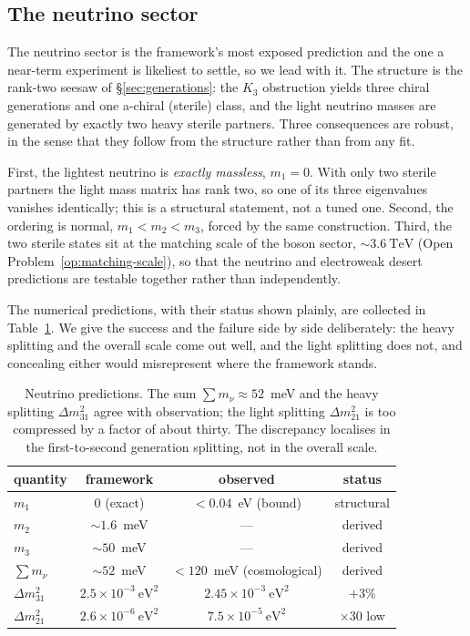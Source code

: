 \subsection{The neutrino sector}

The neutrino sector is the framework's most exposed prediction and the one a near-term experiment is
likeliest to settle, so we lead with it. The structure is the rank-two seesaw of
\S\ref{sec:generations}: the $K_3$ obstruction yields three chiral generations and one a-chiral
(sterile) class, and the light neutrino masses are generated by exactly two heavy sterile partners.
Three consequences are robust, in the sense that they follow from the structure rather than from any
fit.

First, the lightest neutrino is \emph{exactly massless}, $m_1 = 0$. With only two sterile partners
the light mass matrix has rank two, so one of its three eigenvalues vanishes identically; this is a
structural statement, not a tuned one. Second, the ordering is normal, $m_1 < m_2 < m_3$, forced by
the same construction. Third, the two sterile states sit at the matching scale of the boson sector,
$\sim 3.6\ \mathrm{TeV}$ (Open Problem~\ref{op:matching-scale}), so that the neutrino and electroweak
desert predictions are testable together rather than independently.

The numerical predictions, with their status shown plainly, are collected in
Table~\ref{tab:neutrino}. We give the success and the failure side by side deliberately: the heavy
splitting and the overall scale come out well, and the light splitting does not, and concealing
either would misrepresent where the framework stands.

\begin{table}[h]
\centering
\begin{tabular}{lccc}
\hline
quantity & framework & observed & status \\
\hline
$m_1$            & $0$ (exact)                   & $< 0.04$~eV (bound)        & structural \\
$m_2$            & $\sim 1.6$~meV                & ---                        & derived \\
$m_3$            & $\sim 50$~meV                 & ---                        & derived \\
$\sum m_\nu$     & $\sim 52$~meV                 & $< 120$~meV (cosmological) & derived \\
$\Delta m^2_{31}$& $2.5\times10^{-3}\ \mathrm{eV}^2$ & $2.45\times10^{-3}\ \mathrm{eV}^2$ & $+3\%$ \\
$\Delta m^2_{21}$& $2.6\times10^{-6}\ \mathrm{eV}^2$ & $7.5\times10^{-5}\ \mathrm{eV}^2$  & $\times 30$ low \\
\hline
\end{tabular}
\caption{Neutrino predictions. The sum $\sum m_\nu \approx 52$~meV and the heavy splitting
$\Delta m^2_{31}$ agree with observation; the light splitting $\Delta m^2_{21}$ is too compressed by
a factor of about thirty. The discrepancy localises in the first-to-second generation splitting, not
in the overall scale.}
\label{tab:neutrino}
\end{table}

